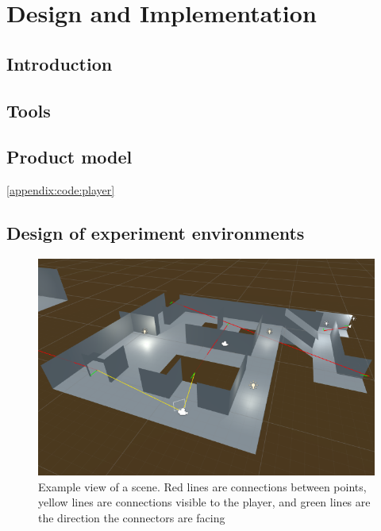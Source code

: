 \chapter[Product]{Design and Implementation}
\label{design}

\begin{multicols*}{2}

	\section{Introduction}

	\section{Tools}

	\section{Product model}
		\autoref{appendix:code:player}

	\section{Design of experiment environments}

\end{multicols*}

		\begin{figure}[h]
			\label{design:fig:scene}
			\includegraphics[width=1\textwidth]{Images/Lines_Everywhere2}
			\centering
			\caption{Example view of a scene.
				Red lines are connections between points,
				yellow lines are connections visible to the player,
				and green lines are the direction the connectors are facing}
		\end{figure}

